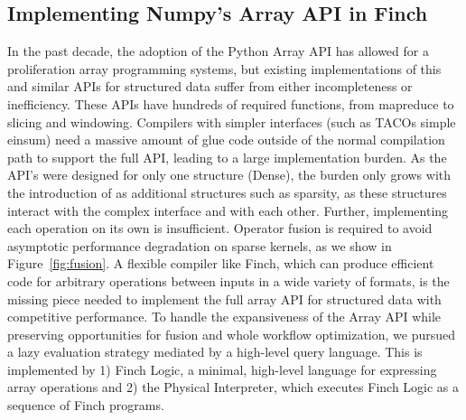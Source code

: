 \subsection{Implementing Numpy's Array API in Finch}
In the past decade, the adoption of the Python Array API \cite{harris_array_2020} has allowed for a proliferation array programming systems, but existing implementations of this and similar APIs for structured data suffer from either incompleteness or inefficiency.
%
These APIs have hundreds of required functions, from mapreduce to slicing and windowing. 
%
Compilers with simpler interfaces (such as TACOs simple einsum) need a massive amount of glue code outside of the normal compilation path to support the full API, leading to a large implementation burden.
%
As the API's were designed for only one structure (Dense), the burden only grows with the introduction of as additional structures such as sparsity, as these structures interact with the complex interface and with each other.
%
%
Further, implementing each operation on its own is insufficient. Operator fusion is required to avoid asymptotic performance degradation on sparse kernels, as we show in Figure~\ref{fig:fusion}.
%
A flexible compiler like Finch, which can produce efficient code for arbitrary operations between inputs in a wide variety of formats, is the missing piece needed to implement the full array API for structured data with competitive performance.
%
To handle the expansiveness of the Array API while preserving opportunities for fusion and whole workflow optimization, we pursued a lazy evaluation strategy mediated by a high-level query language.
%
This is implemented by 1) Finch Logic, a minimal, high-level language for expressing array operations and 2) the Physical Interpreter, which executes Finch Logic as a sequence of Finch programs.




